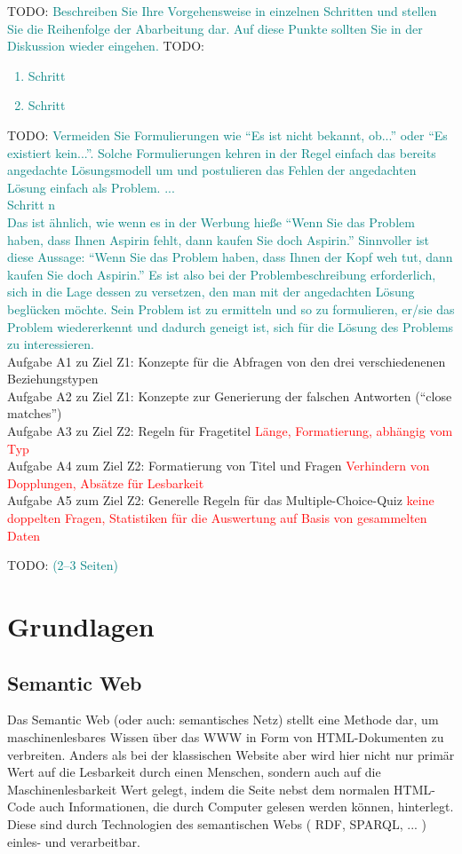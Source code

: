 \documentclass[headsepline,titlepage,ngerman,twoside,12pt]{report}
\newcommand\idea[1]{\textcolor{red}{#1}}
\newcommand\todo[1]{TODO: \textcolor{teal}{#1}}
\begin{document}
\todo{
Beschreiben Sie Ihre Vorgehensweise in einzelnen Schritten und stellen Sie die Reihenfolge der Abarbeitung dar.
Auf diese Punkte sollten Sie in der Diskussion wieder eingehen.
}
\todo{
\begin{enumerate}
\item Schritt 
\item Schritt 
\end{enumerate}
}
\todo{
Vermeiden Sie Formulierungen wie \enquote{Es ist nicht bekannt, ob...} oder \enquote{Es existiert kein...}.
Solche Formulierungen kehren in der Regel einfach das bereits angedachte Lösungsmodell um und postulieren das Fehlen der angedachten Lösung einfach als Problem.
... \\
Schritt n\\
Das ist ähnlich, wie wenn es in der Werbung hieße \enquote{Wenn Sie das Problem haben, dass Ihnen Aspirin fehlt, dann kaufen Sie doch Aspirin.}
Sinnvoller ist diese Aussage: \enquote{Wenn Sie das Problem haben, dass Ihnen der Kopf weh tut, dann kaufen Sie doch Aspirin.}
Es ist also bei der Problembeschreibung erforderlich, sich in die Lage dessen zu versetzen, den man mit der angedachten Lösung beglücken möchte.
Sein Problem ist zu ermitteln und so zu formulieren, er/sie das Problem wiedererkennt und dadurch geneigt ist, sich für die Lösung des Problems zu interessieren.
} 
\\Aufgabe A1 zu Ziel Z1: Konzepte für die Abfragen von den drei verschiedenenen Beziehungstypen
\\Aufgabe A2 zu Ziel Z1: Konzepte zur Generierung der falschen Antworten  (\enquote{close matches})
\\Aufgabe A3 zu Ziel Z2: Regeln für Fragetitel \idea{Länge, Formatierung, abhängig vom Typ}
\\Aufgabe A4 zum Ziel Z2: Formatierung von Titel und Fragen \idea{Verhindern von Dopplungen, Absätze für Lesbarkeit}
\\Aufgabe A5 zum Ziel Z2: Generelle Regeln für das Multiple-Choice-Quiz \idea{keine doppelten Fragen, Statistiken für die Auswertung auf Basis von gesammelten Daten}

\todo{(2--3 Seiten)}
\chapter{Grundlagen}

\section{Semantic Web}
\label{sec:semanticweb}
Das Semantic Web (oder auch: semantisches Netz) stellt eine Methode dar, um maschinenlesbares Wissen über das \ac{WWW} in Form von HTML-Dokumenten zu verbreiten.
Anders als bei der klassischen Website aber wird hier nicht nur primär Wert auf die Lesbarkeit durch einen Menschen, sondern auch auf die Maschinenlesbarkeit Wert gelegt, indem die Seite nebst dem normalen HTML-Code auch Informationen, die durch Computer gelesen werden können, hinterlegt. Diese sind durch Technologien des semantischen Webs ( \acs{RDF}, \acs{SPARQL}, ... ) einles- und verarbeitbar.
\end{document}
